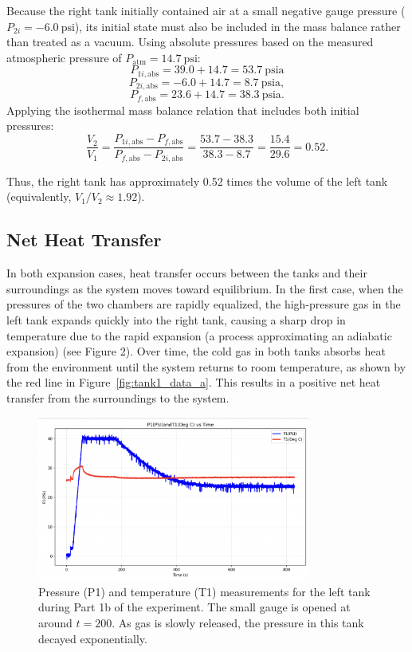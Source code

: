 \documentclass[12pt]{article}
\begin{document}
\newpage
Because the right tank initially contained air at a small negative gauge pressure ($P_{2i} = -6.0~\text{psi}$), its initial state must also be included in the mass balance rather than treated as a vacuum. Using absolute pressures based on the measured atmospheric pressure of $P_{\text{atm}} = 14.7~\text{psi}$:
\[P_{1i,\text{abs}} = 39.0 + 14.7 = 53.7~\text{psia}\]
\[P_{2i,\text{abs}} = -6.0 + 14.7 = 8.7~\text{psia},\]
\[P_{f,\text{abs}} = 23.6 + 14.7 = 38.3~\text{psia}.\]
Applying the isothermal mass balance relation that includes both initial pressures:
\[
\frac{V_2}{V_1} = \frac{P_{1i,\text{abs}} - P_{f,\text{abs}}}{P_{f,\text{abs}} - P_{2i,\text{abs}}}
= \frac{53.7 - 38.3}{38.3 - 8.7}
= \frac{15.4}{29.6}
= 0.52. \]

Thus, the right tank has approximately 0.52 times the volume of the left tank (equivalently, $V_1/V_2 \approx 1.92$).

\subsection*{Net Heat Transfer}
In both expansion cases, heat transfer occurs between the tanks and their surroundings as the system moves toward equilibrium. 
In the first case, when the pressures of the two chambers are rapidly equalized, the high-pressure gas in the left tank expands quickly into the right tank, causing a sharp drop in temperature due to the rapid expansion (a process approximating an adiabatic expansion) (see Figure 2). 
Over time, the cold gas in both tanks absorbs heat from the environment until the system returns to room temperature, as shown by the red line in Figure~\ref{fig:tank1_data_a}. This results in a positive net heat transfer from the surroundings to the system.

\begin{figure}[h!]
\centering
\includegraphics[width=0.8\textwidth]{1b-left_tank.png}
\caption{Pressure (P1) and temperature (T1) measurements for the left tank during Part 1b of the experiment. The small gauge is opened at around $t=200$. As gas is slowly released, the pressure in this tank decayed exponentially.}
\label{fig:tank1_data_b}
\end{figure}
\end{document}
